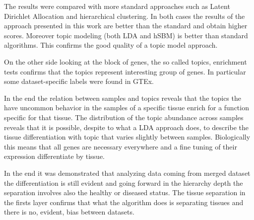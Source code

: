 The results were compared with more standard approaches such as Latent Dirichlet Allocation and hierarchical clustering. In both cases the results of the approach presented in this work are better than the standard and obtain higher scores. Moreover topic modeling (both LDA and hSBM) is better than standard algorithms. This confirms the good quality of a topic model approach.

On the other side looking at the block of genes, the so called topics, enrichment tests confirms that the topics represent interesting group of genes. In particular some dataset-specific labels were found in GTEx.

In the end the relation between samples and topics reveals that the topics the have uncommon behavior in the samples of a specific tissue enrich for a function specific for that tissue. The distribution of the topic abundance across samples reveals that it is possible, despite to what a LDA approach does, to describe the tissue differentiation with topic that varies slightly between samples. Biologically this means that all genes are necessary everywhere and a fine tuning of their expression differentiate by tissue.

In the end it was demonstrated that analyzing data coming from merged dataset the differentiation is still evident and going forward in the hierarchy depth the separation involves also the healthy or diseased status. The tissue separation in the firsts layer confirms that what the algorithm does is separating tissues and there is no, evident, bias between datasets.